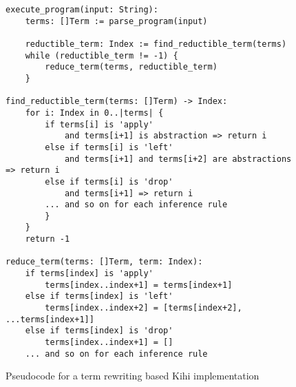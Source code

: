 \begin{figure}[htb]
    \centering
    \begin{lstlisting}
execute_program(input: String):
    terms: []Term := parse_program(input)
    
    reductible_term: Index := find_reductible_term(terms)
    while (reductible_term != -1) {
        reduce_term(terms, reductible_term)
    }

find_reductible_term(terms: []Term) -> Index:
    for i: Index in 0..|terms| {
        if terms[i] is 'apply'
            and terms[i+1] is abstraction => return i
        else if terms[i] is 'left'
            and terms[i+1] and terms[i+2] are abstractions => return i
        else if terms[i] is 'drop'
            and terms[i+1] => return i
        ... and so on for each inference rule
        }
    }
    return -1

reduce_term(terms: []Term, term: Index):
    if terms[index] is 'apply'
        terms[index..index+1] = terms[index+1]
    else if terms[index] is 'left'
        terms[index..index+2] = [terms[index+2], ...terms[index+1]]
    else if terms[index] is 'drop'
        terms[index..index+1] = []
    ... and so on for each inference rule
    \end{lstlisting}
    \caption{Pseudocode for a term rewriting based Kihi implementation}
    \label{fig:term_rewriting_pseudocode}
\end{figure}